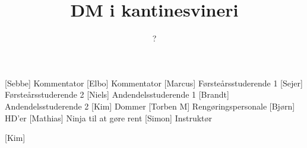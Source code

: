 \documentclass[a4paper,11pt]{article}
\title{DM i kantinesvineri}
\author{?}
\begin{document}
\maketitle

\begin{roles}
[Sebbe] Kommentator
[Elbo] Kommentator
[Marcus] Førsteårsstuderende 1
[Sejer] Førsteårsstuderende 2
[Niels] Andendelsstuderende 1
[Brandt] Andendelsstuderende 2
[Kim] Dommer
[Torben M] Rengøringspersonale
[Bjørn] HD'er
[Mathias] Ninja til at gøre rent
[Simon] Instruktør
\end{roles}

\begin{props}
    [Kim]
\end{props}
\end{document}
